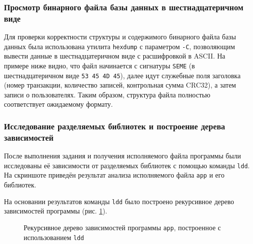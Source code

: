 \subsubsection{Просмотр бинарного файла базы данных в шестнадцатеричном виде}

Для проверки корректности структуры и содержимого бинарного файла базы данных была использована утилита \texttt{hexdump} с параметром \texttt{-C}, позволяющим вывести данные в шестнадцатеричном виде с расшифровкой в ASCII. На примере ниже видно, что файл начинается с сигнатуры \texttt{SEME} (в шестнадцатеричном виде \texttt{53 45 4D 45}), далее идут служебные поля заголовка (номер транзакции, количество записей, контрольная сумма CRC32), а затем записи о пользователях. Таким образом, структура файла полностью соответствует ожидаемому формату.


\subsubsection{Исследование разделяемых библиотек и построение дерева зависимостей}

После выполнения задания и получения исполняемого файла программы были исследованы её зависимости от разделяемых библиотек с помощью команды \texttt{ldd}. На скриншоте приведён результат анализа исполняемого файла \texttt{app} и его библиотек.


На основании результатов команды \texttt{ldd} было построено рекурсивное дерево зависимостей программы (рис. \ref{fig:app-ldd-tree}).

\begin{figure}[H]
\caption{Рекурсивное дерево зависимостей программы \texttt{app}, построенное с использованием \texttt{ldd}}
\label{fig:app-ldd-tree}
\end{figure}